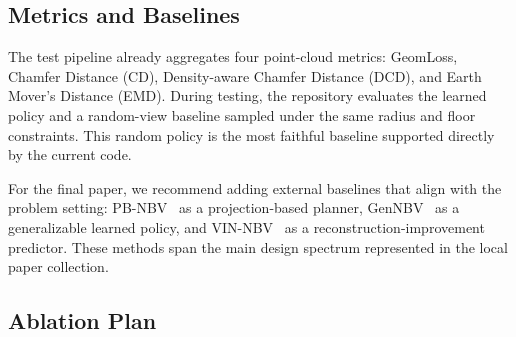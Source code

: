 \subsection{Metrics and Baselines}
\label{sec:metrics}

The test pipeline already aggregates four point-cloud metrics: GeomLoss, Chamfer Distance (CD), Density-aware Chamfer Distance (DCD), and Earth Mover's Distance (EMD). During testing, the repository evaluates the learned policy and a random-view baseline sampled under the same radius and floor constraints. This random policy is the most faithful baseline supported directly by the current code.

For the final paper, we recommend adding external baselines that align with the problem setting: PB-NBV~\cite{jia2025pbnbv} as a projection-based planner, GenNBV~\cite{chen2024gennbv} as a generalizable learned policy, and VIN-NBV~\cite{frahm2025vinnbv} as a reconstruction-improvement predictor. These methods span the main design spectrum represented in the local paper collection.

\begin{table}[t]
    \centering
    \small
    \caption{Main quantitative comparison template. Numeric cells are left blank intentionally in this draft. Once the runs are available, the repository already exports test summaries compatible with this table.}
    \label{tab:main_results}
\end{table}

\subsection{Ablation Plan}
\label{sec:ablation}


